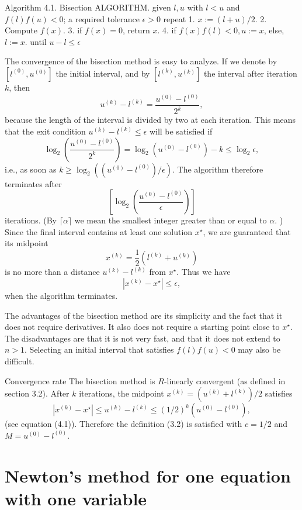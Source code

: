 \begin{algorithm}
    Algorithm 4.1. Bisection ALGORITHM.
given $ l, u $ with $ l<u $ and $ f(l) f(u)<0 $; a required tolerance $ \epsilon>0 $ repeat
1. $ x:=(l+u) / 2 $.
2. Compute $ f(x) $.
3. if $ f(x)=0 $, return $ x $.
4. if $ f(x) f(l)<0, u:=x $, else, $ l:=x $.
until $ u-l \leq \epsilon $
\end{algorithm}

The convergence of the bisection method is easy to analyze. If we denote by $ \left[l^{(0)}, u^{(0)}\right] $ the initial interval, and by $ \left[l^{(k)}, u^{(k)}\right] $ the interval after iteration $ k $, then
$$
u^{(k)}-l^{(k)}=\frac{u^{(0)}-l^{(0)}}{2^{k}},
$$
because the length of the interval is divided by two at each iteration. This means that the exit condition $ u^{(k)}-l^{(k)} \leq \epsilon $ will be satisfied if
$$
\log _{2}\left(\frac{u^{(0)}-l^{(0)}}{2^{k}}\right)=\log _{2}\left(u^{(0)}-l^{(0)}\right)-k \leq \log _{2} \epsilon,
$$
i.e., as soon as $ k \geq \log _{2}\left(\left(u^{(0)}-l^{(0)}\right) / \epsilon\right) $. The algorithm therefore terminates after
$$
\left[\log _{2}\left(\frac{u^{(0)}-l^{(0)}}{\epsilon}\right)\right]
$$
iterations. (By $ \lceil\alpha\rceil $ we mean the smallest integer greater than or equal to $ \alpha . $ )
Since the final interval contains at least one solution $ x^{\star} $, we are guaranteed that its midpoint
$$
x^{(k)}=\frac{1}{2}\left(l^{(k)}+u^{(k)}\right)
$$
is no more than a distance $ u^{(k)}-l^{(k)} $ from $ x^{\star} $. Thus we have
$$
\left|x^{(k)}-x^{\star}\right| \leq \epsilon,
$$
when the algorithm terminates.

The advantages of the bisection method are its simplicity and the fact that it does not require derivatives. It also does not require a starting point close to $ x^{\star} $. The disadvantages are that it is not very fast, and that it does not extend to $ n>1 $. Selecting an initial interval that satisfies $ f(l) f(u)<0 $ may also be difficult.

Convergence rate The bisection method is $ R $-linearly convergent (as defined in section 3.2). After $ k $ iterations, the midpoint $ x^{(k)}=\left(u^{(k)}+l^{(k)}\right) / 2 $ satisfies
$$
\left|x^{(k)}-x^{\star}\right| \leq u^{(k)}-l^{(k)} \leq(1 / 2)^{k}\left(u^{(0)}-l^{(0)}\right),
$$
(see equation (4.1)). Therefore the definition (3.2) is satisfied with $ c=1 / 2 $ and $ M=u^{(0)}-l^{(0)} $.

\section{Newton's method for one equation with one variable}

